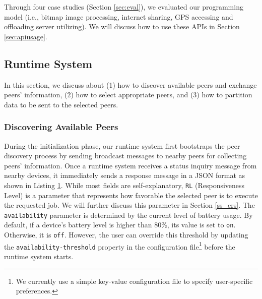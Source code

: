\documentclass{sig-alternate}
\begin{document}
Through four case studies (Section \ref{sec:eval}), we evaluated our programming model (i.e., bitmap image processing, internet sharing, GPS accessing and offloading server utilizing). We will discuss how to use these APIs in Section \ref{sec:apiusage}.


\subsection{Runtime System} \label{scheduling}
In this section, we discuss about (1) how to discover available peers and exchange peers' information, (2) how to select appropriate peers, and (3) how to partition data to be sent to the selected peers. 

\subsubsection{Discovering Available Peers}\label{ss_dfp}
During the initialization phase, our runtime system first bootstraps the peer discovery process by sending broadcast messages to nearby peers for collecting peers' information. Once a runtime system receives a status inquiry message from nearby devices, it immediately sends a response message in a JSON format as shown in Listing \ref{code:jsonResponse}. While most fields are self-explanatory, \texttt{RL} (Responsiveness Level) is a parameter that represents how favorable the selected peer is to execute the requested job. We will further discuss this parameter in Section \ref{ss_ers}. The \texttt{availability} parameter is determined by the current level of battery usage. By default, if a device's battery level is higher than 80\%, its value is set to \texttt{on}. Otherwise, it is \texttt{off}. However, the user can override this threshold by updating the \texttt{availability-threshold} property in the configuration file\footnote{We currently use a simple key-value configuration file to specify user-specific preferences.} before the runtime system starts. 

\begin{figure} [!tbh]
\noindent {}	
\label{code:jsonResponse}
\end{figure}
\end{document}
